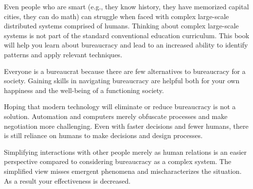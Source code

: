 Even people who are smart (e.g., they know history, they have memorized capital cities, they can do math) can struggle when faced with complex large-scale distributed systems comprised of humans. Thinking about complex large-scale systems is not part of the standard conventional education curriculum. This book will help you learn about bureaucracy and lead to an increased ability to identify patterns and apply relevant techniques.

Everyone is a bureaucrat because there are few alternatives to bureaucracy for a society. Gaining skills in navigating bureaucracy are helpful both for your own happiness and the well-being of a functioning society. 

Hoping that modern technology will eliminate or reduce bureaucracy is not a solution. Automation and computers merely obfuscate processes and make negotiation more challenging. Even with faster decisions and fewer humans, there is still reliance on humans to make decisions and design processes.

Simplifying interactions with other people merely as human relations is an easier perspective compared to considering bureaucracy as a complex system.
The simplified view misses emergent phenomena and mischaracterizes the situation. As a result your effectiveness is decreased.








